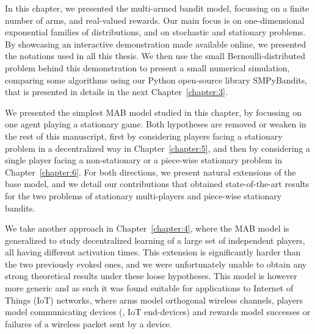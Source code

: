 In this chapter, we presented the multi-armed bandit model, focussing on a finite number of arms, and real-valued rewards.
Our main focus is on one-dimensional exponential families of distributions, and on stochastic and stationary problems.
By showcasing an interactive demonstration made available online,
we presented the notations used in all this thesis.
%
We then use the small Bernoulli-distributed problem behind this demonstration
to present a small numerical simulation, comparing some algorithms using our Python open-source library SMPyBandits, that is presented in details in the next Chapter~\ref{chapter:3}.

We presented the simplest MAB model studied in this chapter, by focussing on one agent playing a stationary game.
Both hypotheses are removed or weaken in the rest of this manuscript,
first by considering players facing a stationary problem in a decentralized way in Chapter~\ref{chapter:5},
and then by considering a single player facing a non-stationary or a piece-wise stationary problem in Chapter~\ref{chapter:6}.
%
For both directions, we present natural extensions of the base model, and we detail our contributions that obtained state-of-the-art results for the two problems
of stationary multi-players and piece-wise stationary bandits.

We take another approach in Chapter~\ref{chapter:4}, where the MAB model is generalized to study decentralized learning of a large set of independent players, all having different activation times.
This extension is significantly harder than the two previously evoked ones, and we were unfortunately unable to obtain any strong theoretical results under these loose hypotheses.
This model is however more generic and as such it was found suitable for applications to Internet of Things (IoT) networks, where arms model orthogonal wireless channels, players model communicating devices (\ie, IoT end-devices) and rewards model successes or failures of a wireless packet sent by a device.


